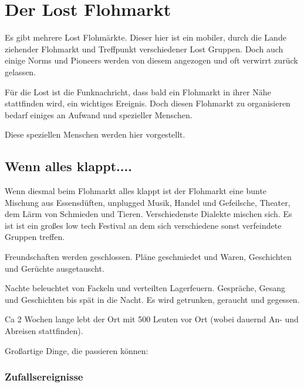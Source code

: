 
\chapter{Der Lost Flohmarkt}

Es gibt mehrere Lost Flohmärkte. Dieser hier ist ein mobiler, durch die Lande ziehender Flohmarkt und Treffpunkt verschiedener Lost Gruppen. Doch auch einige Norms und Pioneers werden von diesem angezogen und oft verwirrt zurück gelassen.

Für die Lost ist die Funknachricht, dass bald ein Flohmarkt in ihrer Nähe stattfinden wird, ein wichtiges Ereignis. Doch diesen Flohmarkt zu organisieren bedarf einiges an Aufwand und spezieller Menschen.

Diese speziellen Menschen werden hier vorgestellt.

\section{Wenn alles klappt....}

Wenn diesmal beim Flohmarkt alles klappt ist der Flohmarkt eine bunte Mischung aus Essensdüften, unplugged Musik, Handel und Gefeilsche, Theater, dem Lärm von Schmieden und Tieren. Verschiedenste Dialekte mischen sich. Es ist ist ein großes low tech Festival an dem sich verschiedene sonst verfeindete Gruppen treffen.

Freundschaften werden geschlossen. Pläne geschmiedet und Waren, Geschichten und Gerüchte ausgetauscht.

Nachte beleuchtet von Fackeln und verteilten Lagerfeuern. Gespräche, Gesang und Geschichten bis spät in die Nacht. Es wird getrunken, geraucht und gegessen.

Ca 2 Wochen lange lebt der Ort mit 500 Leuten vor Ort (wobei dauernd An- und Abreisen stattfinden).

Großartige Dinge, die passieren können:

\subsection{Zufallsereignisse}

